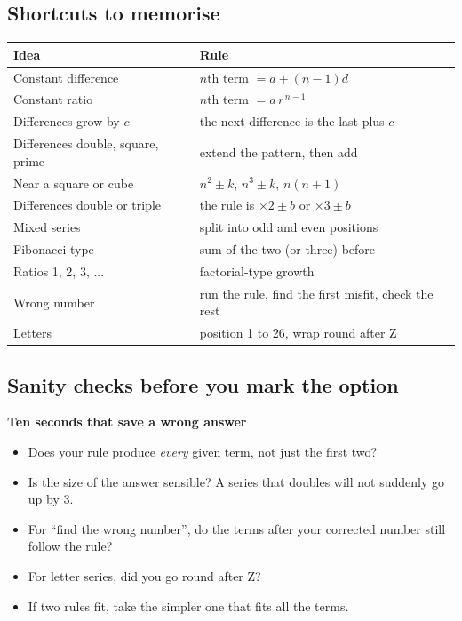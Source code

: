 \documentclass[11pt,a4paper]{article}
\let\oldsubsection\subsection
\renewcommand{\subsection}{\needspace{9\baselineskip}\oldsubsection}
\newcommand{\infobox}[2]{\par\medskip\noindent\begingroup\setlength{\fboxsep}{7pt}%
  \colorbox{codebg}{\parbox{\dimexpr\linewidth-14pt\relax}{\textbf{\color{ember}#1}\par\smallskip #2}}\endgroup\par\medskip}
\begin{document}
\subsection*{Shortcuts to memorise}
\begin{center}\small\renewcommand{\arraystretch}{1.9}\setlength{\tabcolsep}{8pt}
\begin{tabularx}{\linewidth}{@{}>{\raggedright\arraybackslash}X>{\raggedright\arraybackslash}X@{}}
\toprule
\textbf{\color{slate}Idea} & \textbf{\color{slate}Rule} \\ \midrule
Constant difference & $n$th term $=a+(n-1)d$ \\
Constant ratio & $n$th term $=a\,r^{\,n-1}$ \\
Differences grow by $c$ & the next difference is the last plus $c$ \\
Differences double, square, prime & extend the pattern, then add \\
Near a square or cube & $n^2\pm k$, $n^3\pm k$, $n(n+1)$ \\
Differences double or triple & the rule is $\times 2\pm b$ or $\times 3\pm b$ \\
Mixed series & split into odd and even positions \\
Fibonacci type & sum of the two (or three) before \\
Ratios 1, 2, 3, ... & factorial-type growth \\
Wrong number & run the rule, find the first misfit, check the rest \\
Letters & position 1 to 26, wrap round after Z \\
\bottomrule
\end{tabularx}\end{center}

\subsection*{Sanity checks before you mark the option}
\infobox{Ten seconds that save a wrong answer}{
\begin{itemize}
\item Does your rule produce \emph{every} given term, not just the first two?
\item Is the size of the answer sensible? A series that doubles will not suddenly go up by 3.
\item For ``find the wrong number'', do the terms after your corrected number still follow the rule?
\item For letter series, did you go round after Z?
\item If two rules fit, take the simpler one that fits all the terms.
\end{itemize}}
\end{document}
